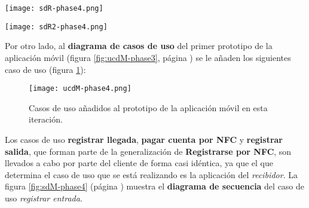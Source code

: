   \begin{sidewaysfigure}[hp]
    \begin{center}
      \texttt{[image: sdR-phase4.png]}
      \caption{Diagrama de secuencia del caso de uso \emph{registrar salida
      por \acs{NFC}}.}
      \label{fig:sdR-phase4}
    \end{center}
  \end{sidewaysfigure}

  \begin{sidewaysfigure}[hp]
    \begin{center}
      \texttt{[image: sdR2-phase4.png]}
      \caption{Diagrama de secuencia del caso de uso \emph{cobrar cliente
      por \acs{NFC}}.}
      \label{fig:sdR2-phase4}
    \end{center}
  \end{sidewaysfigure}

Por otro lado, al \textbf{diagrama de casos de uso} del primer prototipo
de la aplicación móvil (figura \ref{fig:ucdM-phase3}, página
\pageref{fig:ucdM-phase3}) se le añaden los siguientes caso de uso (figura
\ref{fig:ucdM-phase4}):

  \begin{figure}[H]
    \begin{center}
      \texttt{[image: ucdM-phase4.png]}
      \caption{Casos de uso añadidos al prototipo de la aplicación
      móvil en esta iteración.}
      \label{fig:ucdM-phase4}
    \end{center}
  \end{figure}

Los casos de uso \textbf{registrar llegada}, \textbf{pagar cuenta por
\acs{NFC}} y \textbf{registrar salida}, que forman parte de la generalización
de \textbf{Registrarse por \acs{NFC}}, son llevados a cabo por parte del
cliente de forma casi idéntica, ya que el que determina el caso de uso que
se está realizando es la aplicación del \emph{recibidor}. La figura
\ref{fig:sdM-phase4} (página \pageref{fig:sdM-phase4}) muestra el
\textbf{diagrama de secuencia} del caso de uso \emph{registrar entrada}.

